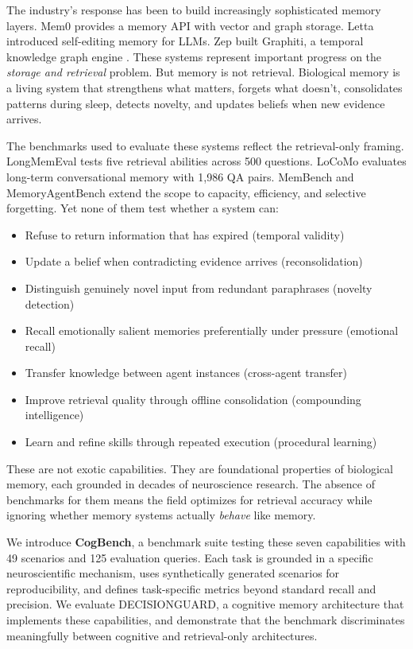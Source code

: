 \documentclass{article}
\begin{document}
The industry's response has been to build increasingly sophisticated memory layers. Mem0 \citep{mem0} provides a memory API with vector and graph storage. Letta \citep{packer2023memgpt} introduced self-editing memory for LLMs. Zep built Graphiti, a temporal knowledge graph engine \citep{zep2025}. These systems represent important progress on the \emph{storage and retrieval} problem. But memory is not retrieval. Biological memory is a living system that strengthens what matters, forgets what doesn't, consolidates patterns during sleep, detects novelty, and updates beliefs when new evidence arrives.

The benchmarks used to evaluate these systems reflect the retrieval-only framing. LongMemEval \citep{wu2024longmemeval} tests five retrieval abilities across 500 questions. LoCoMo \citep{maharana2024locomo} evaluates long-term conversational memory with 1,986 QA pairs. MemBench \citep{tan2025membench} and MemoryAgentBench \citep{zhang2026memoryagentbench} extend the scope to capacity, efficiency, and selective forgetting. Yet none of them test whether a system can:

\begin{itemize}[nosep]
  \item Refuse to return information that has expired (temporal validity)
  \item Update a belief when contradicting evidence arrives (reconsolidation)
  \item Distinguish genuinely novel input from redundant paraphrases (novelty detection)
  \item Recall emotionally salient memories preferentially under pressure (emotional recall)
  \item Transfer knowledge between agent instances (cross-agent transfer)
  \item Improve retrieval quality through offline consolidation (compounding intelligence)
  \item Learn and refine skills through repeated execution (procedural learning)
\end{itemize}

These are not exotic capabilities. They are foundational properties of biological memory, each grounded in decades of neuroscience research. The absence of benchmarks for them means the field optimizes for retrieval accuracy while ignoring whether memory systems actually \emph{behave} like memory.

We introduce \textbf{CogBench}, a benchmark suite testing these seven capabilities with 49 scenarios and 125 evaluation queries. Each task is grounded in a specific neuroscientific mechanism, uses synthetically generated scenarios for reproducibility, and defines task-specific metrics beyond standard recall and precision. We evaluate DECISIONGUARD, a cognitive memory architecture that implements these capabilities, and demonstrate that the benchmark discriminates meaningfully between cognitive and retrieval-only architectures.
\end{document}
